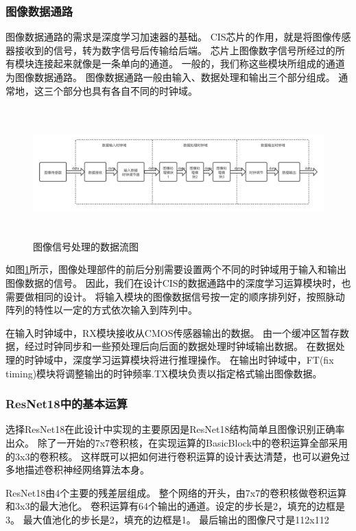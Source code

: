 \subsubsection{图像数据通路}
图像数据通路的需求是深度学习加速器的基础。
CIS芯片的作用，就是将图像传感器接收到的信号，转为数字信号后传输给后端。
芯片上图像数字信号所经过的所有模块连接起来就像是一条单向的通道。
一般的，我们称这些模块所组成的通道为图像数据通路。
图像数据通路一般由输入、数据处理和输出三个部分组成。
通常地，这三个部分也具有各自不同的时钟域。

\begin{figure}[htbp]
    \centering
    \includegraphics[width=15cm,height=5cm]{figures/datapath.png}
    \caption{图像信号处理的数据流图}
    \label{fig:datapath}
\end{figure}

如图\ref{fig:datapath}所示，图像处理部件的前后分别需要设置两个不同的时钟域用于输入和输出图像数据的信号。
因此，我们在设计CIS的数据通路中的深度学习运算模块时，也需要做相同的设计。
将输入模块的图像数据信号按一定的顺序排列好，按照脉动阵列的特性以一定的方式依次输入到阵列中。


在输入时钟域中，RX模块接收从CMOS传感器输出的数据。
由一个缓冲区暂存数据，经过时钟同步和一些预处理后向后面的数据处理时钟域输出数据。
在数据处理的时钟域中，深度学习运算模块将进行推理操作。
在输出时钟域中，FT(fix timing)模块将调整输出的时钟频率.TX模块负责以指定格式输出图像数据。  


\subsubsection{ResNet18中的基本运算}
选择ResNet18在此设计中实现的主要原因是ResNet18结构简单且图像识别正确率出众。
除了一开始的7x7卷积核，在实现运算的BasicBlock中的卷积运算全部采用的3x3的卷积核。
这样既可以把如何进行卷积运算的设计表达清楚，也可以避免过多地描述卷积神经网络算法本身。

ResNet18由4个主要的残差层组成。
整个网络的开头，由7x7的卷积核做卷积运算和3x3的最大池化。
卷积运算有64个输出的通道。设定的步长是2，填充的边框是3。
最大值池化的步长是2，填充的边框是1。
最后输出的图像尺寸是112x112

